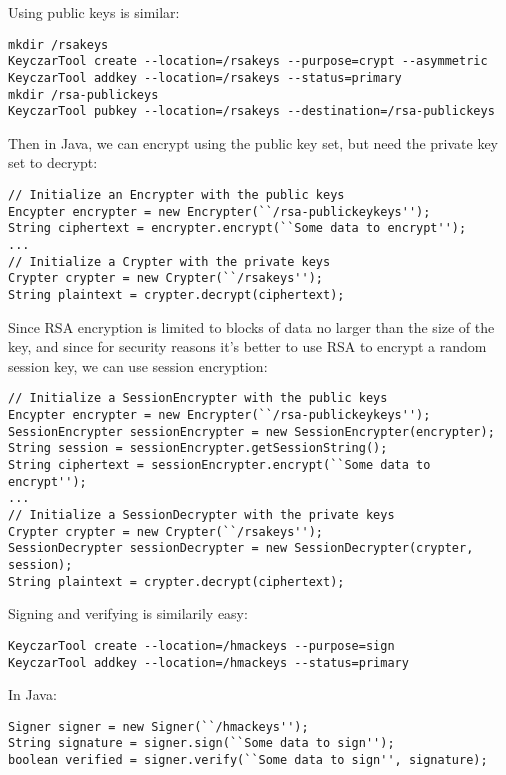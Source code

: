 \documentclass{llncs}
\begin{document}
Using public keys is similar:


\begin{verbatim}
mkdir /rsakeys
KeyczarTool create --location=/rsakeys --purpose=crypt --asymmetric
KeyczarTool addkey --location=/rsakeys --status=primary
mkdir /rsa-publickeys
KeyczarTool pubkey --location=/rsakeys --destination=/rsa-publickeys
\end{verbatim}

Then in Java, we can encrypt using the public key set, but need the
private key set to decrypt:

\begin{verbatim}
// Initialize an Encrypter with the public keys
Encypter encrypter = new Encrypter(``/rsa-publickeykeys'');
String ciphertext = encrypter.encrypt(``Some data to encrypt'');
... 
// Initialize a Crypter with the private keys
Crypter crypter = new Crypter(``/rsakeys'');
String plaintext = crypter.decrypt(ciphertext);
\end{verbatim}

Since RSA encryption is limited to blocks of data no larger than the
size of the key, and since for security reasons it's better to use RSA
to encrypt a random session key, we can use session encryption:

\begin{verbatim}
// Initialize a SessionEncrypter with the public keys
Encypter encrypter = new Encrypter(``/rsa-publickeykeys'');
SessionEncrypter sessionEncrypter = new SessionEncrypter(encrypter);
String session = sessionEncrypter.getSessionString();
String ciphertext = sessionEncrypter.encrypt(``Some data to encrypt'');
...
// Initialize a SessionDecrypter with the private keys
Crypter crypter = new Crypter(``/rsakeys'');
SessionDecrypter sessionDecrypter = new SessionDecrypter(crypter, session);
String plaintext = crypter.decrypt(ciphertext);
\end{verbatim}

Signing and verifying is similarily easy:
\begin{verbatim}
KeyczarTool create --location=/hmackeys --purpose=sign
KeyczarTool addkey --location=/hmackeys --status=primary
\end{verbatim}

In Java:
\begin{verbatim}
Signer signer = new Signer(``/hmackeys'');
String signature = signer.sign(``Some data to sign'');
boolean verified = signer.verify(``Some data to sign'', signature);
\end{verbatim}
\end{document}

